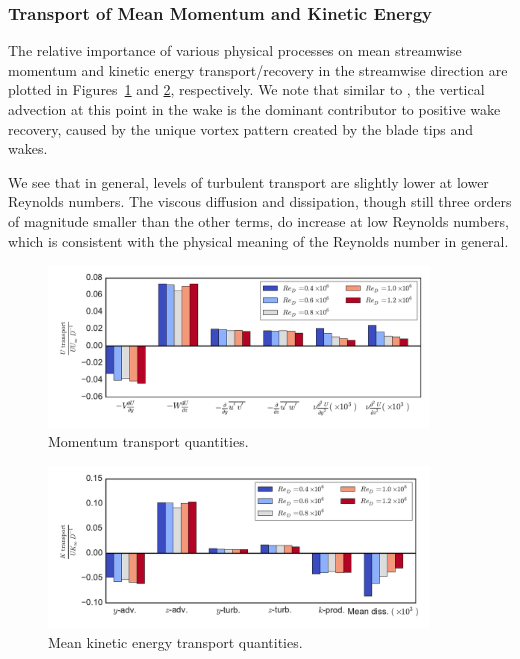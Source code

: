 \documentclass[energies,article,accept,moreauthors,pdftex,12pt,a4paper]{mdpi}
\begin{document}
\subsubsection{Transport of Mean Momentum and Kinetic Energy}

The relative importance of various physical processes on mean streamwise
momentum and kinetic energy transport/recovery in the streamwise direction are
plotted in Figures~\ref{fig:mom-bar-graph} and \ref{fig:K-bar-graph},
respectively. We note that similar to \cite{Bachant2015-JoT}, the vertical
advection at this point in the wake is the dominant contributor to positive wake
recovery, caused by the unique vortex pattern created by the blade tips and
wakes.

We see that in general, levels of turbulent transport are slightly lower at
lower Reynolds numbers. The viscous diffusion and dissipation, though still
three orders of magnitude smaller than the other terms, do increase at low
Reynolds numbers, which is consistent with the physical meaning of the Reynolds 
number
in general.


\begin{figure}[ht!]
\centering
\includegraphics[width=0.9\textwidth]{figures/mom_bar_graph}
\caption{Momentum transport quantities.}
\label{fig:mom-bar-graph}
\end{figure}

\begin{figure}[ht!]
\centering
\includegraphics[width=0.9\textwidth]{figures/K_trans_bar_graph}
\caption{Mean kinetic energy transport quantities.}
\label{fig:K-bar-graph}
\end{figure}
\end{document}

